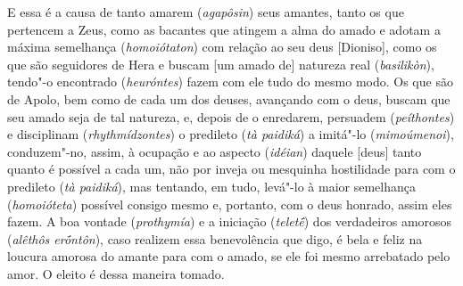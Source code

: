 E essa é a causa de tanto amarem (\emph{agapôsin}) seus amantes, tanto
os que pertencem a Zeus, como as bacantes que atingem a alma do amado e
adotam a máxima semelhança (\emph{homoiótaton}) com relação ao seu deus
[Dioniso], \bekker{[253b]} como os que são seguidores de Hera e buscam
[um amado de] natureza real (\emph{basilikòn}), tendo"-o encontrado
(\emph{heuróntes}) fazem com ele tudo do mesmo modo. \bekker{[253b]} Os que
são de Apolo, bem como de cada um dos deuses, avançando com o deus,
buscam que seu amado seja de tal natureza, e, depois de o enredarem,
persuadem (\emph{peíthontes}) e disciplinam (\emph{rhythmídzontes}) o
predileto (\emph{tà paidiká}) a imitá"-lo (\emph{mimoúmenoi}),
conduzem"-no, assim, à ocupação e ao aspecto (\emph{idéian}) daquele
[deus] tanto quanto é possível a cada um, não por inveja ou
mesquinha hostilidade para com o predileto (\emph{tà paidiká}), mas
tentando, em tudo, levá"-lo à maior semelhança (\emph{homoióteta})
possível consigo mesmo e, portanto, com o deus honrado, assim eles
fazem. \bekker{[253c]} A boa vontade (\emph{prothymía}) e a iniciação
(\emph{teletḗ}) dos verdadeiros amorosos (\emph{alêthôs erṓntôn}), caso
realizem essa benevolência que digo, é bela e feliz na loucura amorosa
do amante para com o amado, se ele foi mesmo arrebatado pelo amor. O
eleito é dessa maneira tomado.

